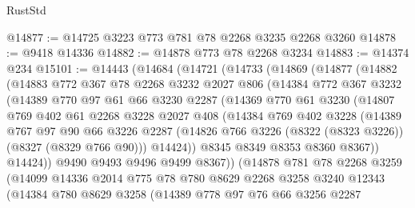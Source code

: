 \begin{lexlean}{RustStd}
\begin{coremodule}
{\begin{coremodule}
{{{{{{{{{{{{{{{{{{{{{{{{{{{{{{{{{{{{{{{{{{{{{{{{{{{{{{@14877 := @14725 @3223 @773 @781 @78 @2268 @3235 @2268 @3260
@14878 := @9418 @14336
@14882 := @14878 @773 @78 @2268 @3234
@14883 := @14374 @234
@15101 := @14443
    (@14684
      (@14721
        (@14733
          (@14869
            (@14877
              (@14882
                (@14883
                  @772
                  @367
                  @78
                  @2268
                  @3232
                  @2027
                  @806
                  (@14384
                    @772
                    @367
                    @3232
                    (@14389
                      @770
                      @97
                      @61
                      @66
                      @3230
                      @2287
                      (@14369
                        @770
                        @61
                        @3230
                        (@14807
                          @769
                          @402
                          @61
                          @2268
                          @3228
                          @2027
                          @408
                          (@14384
                            @769
                            @402
                            @3228
                            (@14389
                              @767
                              @97
                              @90
                              @66
                              @3226
                              @2287
                              (@14826 @766 @3226 (@8322 (@8323 @3226)) (@8327 (@8329 @766 @90)))
                              @14424))
                          @8345
                          @8349
                          @8353
                          @8360
                          @8367))
                      @14424))
                  @9490
                  @9493
                  @9496
                  @9499
                  @8367))
              (@14878
                @781
                @78
                @2268
                @3259
                (@14099
                  @14336
                  @2014
                  @775
                  @78
                  @780
                  @8629
                  @2268
                  @3258
                  @3240
                  @12343
                  (@14384
                    @780
                    @8629
                    @3258
                    (@14389
                      @778
                      @97
                      @76
                      @66
                      @3256
                      @2287
}}}}}}}}}}}}}}}}}}}}}}}}}}}}}}}}}}}}}}}}}}}}}}}}}}}}}}
\end{coremodule}}
\end{coremodule}
\end{lexlean}
